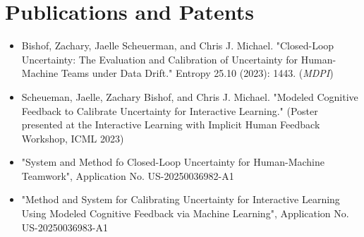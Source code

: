 \documentclass[]{deedy-resume-reversed}
\begin{document}
\begin{minipage}[t]{0.60\textwidth}


\section{Publications and Patents}
\begin{itemize}
	\item Bishof, Zachary, Jaelle Scheuerman, and Chris J. Michael. "Closed-Loop Uncertainty: The Evaluation and Calibration of Uncertainty for Human-Machine Teams under Data Drift." Entropy 25.10 (2023): 1443. (\textit{MDPI})
	\item Scheueman, Jaelle, Zachary Bishof, and Chris J. Michael. "Modeled Cognitive Feedback to Calibrate Uncertainty for Interactive Learning." (Poster presented at the Interactive Learning with Implicit Human Feedback Workshop, ICML 2023)
	\item "System and Method fo Closed-Loop Uncertainty for Human-Machine Teamwork", Application No. US-20250036982-A1
	\item "Method and System for Calibrating Uncertainty for Interactive Learning Using Modeled Cognitive Feedback via Machine Learning", Application No. US-20250036983-A1 
\end{itemize}
\nocite{*}






\end{minipage}
\end{document}
